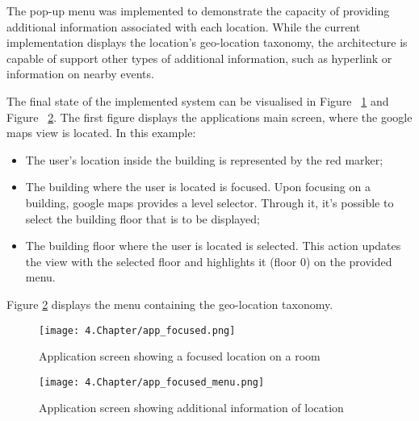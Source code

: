  
The pop-up menu was implemented to demonstrate the capacity of providing additional information associated with each location. While the current implementation displays the location's geo-location taxonomy, the architecture is capable of support other types of additional information, such as hyperlink or information on nearby events.   
 
 
The final state of the implemented system can be visualised in Figure ~\ref{fig:AppFocus} and Figure ~\ref{fig:AppMenu}. The first figure displays the applications main screen, where the google maps view is located. In this example: 
\begin{itemize} 
\item The user's location inside the building is represented by the red marker; 
\item The building where the user is located is focused. Upon focusing on a building, google maps provides a level selector. Through it, it's possible to select the building floor that is to be displayed; 
\item The building floor where the user is located is selected. This action updates the view with the selected floor and highlights it (floor 0) on the provided menu. 
\end{itemize} 
Figure \ref{fig:AppMenu} displays the menu containing the geo-location taxonomy. 
 
 
\begin{figure} 
\centering 
\texttt{[image: 4.Chapter/app\_focused.png]} 
\caption[Application screen showing a focused location on a room]{Application screen showing a focused location on a room} 
\label{fig:AppFocus} 
\end{figure} 
 
 
\begin{figure} 
\centering 
\texttt{[image: 4.Chapter/app\_focused\_menu.png]} 
\caption[Application screen showing additional information of location]{Application screen showing additional information of location} 
\label{fig:AppMenu} 
\end{figure} 
 
 
 